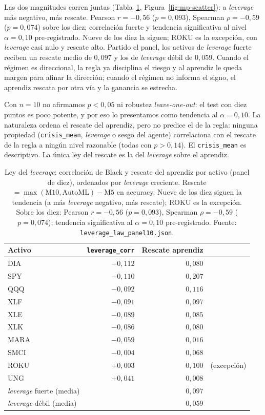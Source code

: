 Las dos magnitudes corren juntas (Tabla~\ref{tab:mp-ley}, Figura~\ref{fig:mp-scatter}): a \emph{leverage} más negativo, más rescate. Pearson $r = -0{,}56$ ($p = 0{,}093$), Spearman $\rho = -0{,}59$ ($p = 0{,}074$) sobre los diez; correlación fuerte y tendencia significativa al nivel $\alpha = 0{,}10$ pre-registrado. Nueve de los diez la siguen; ROKU es la excepción, con \emph{leverage} casi nulo y rescate alto. Partido el panel, los activos de \emph{leverage} fuerte reciben un rescate medio de $0{,}097$ y los de \emph{leverage} débil de $0{,}059$. Cuando el régimen es direccional, la regla ya disciplina el riesgo y al aprendiz le queda margen para afinar la dirección; cuando el régimen no informa el signo, el aprendiz rescata por otra vía y la ganancia se estrecha.

Con $n = 10$ no afirmamos $p < 0{,}05$ ni robustez \emph{leave-one-out}: el test con diez puntos es poco potente, y por eso lo presentamos como tendencia al $\alpha = 0{,}10$. La naturaleza ordena el rescate del aprendiz, pero no predice el de la regla: ninguna propiedad (\texttt{crisis\_mean}, \emph{leverage} o sesgo del agente) correlaciona con el rescate de la regla a ningún nivel razonable (todas con $p > 0{,}14$). El \texttt{crisis\_mean} es descriptivo. La única ley del rescate es la del \emph{leverage} sobre el aprendiz.

\begin{table}[htbp]
\centering
\caption{Ley del \emph{leverage}: correlación de Black y rescate del aprendiz por activo (panel de diez), ordenados por \emph{leverage} creciente. Rescate ${}= \max(\mathrm{M10},\mathrm{AutoML}) - \mathrm{M5}$ en accuracy. Nueve de los diez siguen la tendencia (a más \emph{leverage} negativo, más rescate); ROKU es la excepción. Sobre los diez: Pearson $r = -0{,}56$ ($p = 0{,}093$), Spearman $\rho = -0{,}59$ ($p = 0{,}074$); tendencia significativa al $\alpha = 0{,}10$ pre-registrado. Fuente: \texttt{leverage\_law\_panel10.json}.}
\label{tab:mp-ley}
\begin{tabular}{lrrl}
\toprule
Activo & \texttt{leverage\_corr} & Rescate aprendiz & \\
\midrule
DIA  & $-0{,}112$ & $0{,}080$ & \\
SPY  & $-0{,}110$ & $0{,}207$ & \\
QQQ  & $-0{,}092$ & $0{,}116$ & \\
XLF  & $-0{,}091$ & $0{,}097$ & \\
XLE  & $-0{,}089$ & $0{,}085$ & \\
XLK  & $-0{,}086$ & $0{,}080$ & \\
MARA & $-0{,}059$ & $0{,}016$ & \\
SMCI & $-0{,}004$ & $0{,}068$ & \\
ROKU & $+0{,}003$ & $0{,}100$ & (excepción) \\
UNG  & $+0{,}041$ & $0{,}008$ & \\
\midrule
\emph{leverage} fuerte (media) & & $0{,}097$ & \\
\emph{leverage} débil (media)  & & $0{,}059$ & \\
\bottomrule
\end{tabular}
\end{table}

